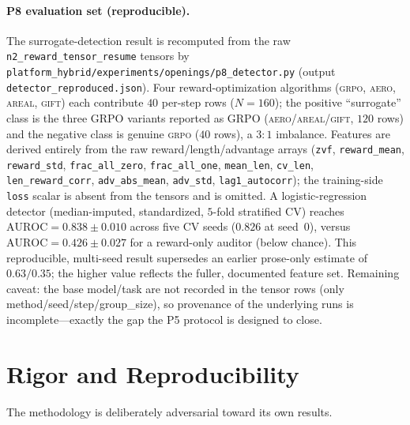 \documentclass[12pt,a4paper]{report}
\begin{document}
\paragraph{P8 evaluation set (reproducible).} The surrogate-detection result is recomputed from the raw \texttt{n2\_reward\_tensor\_resume} tensors by \texttt{platform\_hybrid/experiments/openings/p8\_detector.py} (output \texttt{detector\_reproduced.json}). Four reward-optimization algorithms (\textsc{grpo}, \textsc{aero}, \textsc{areal}, \textsc{gift}) each contribute $40$ per-step rows ($N=160$); the positive ``surrogate'' class is the three GRPO variants reported as GRPO (\textsc{aero}/\textsc{areal}/\textsc{gift}, $120$ rows) and the negative class is genuine \textsc{grpo} ($40$ rows), a $3{:}1$ imbalance. Features are derived entirely from the raw reward/length/advantage arrays (\texttt{zvf}, \texttt{reward\_mean}, \texttt{reward\_std}, \texttt{frac\_all\_zero}, \texttt{frac\_all\_one}, \texttt{mean\_len}, \texttt{cv\_len}, \texttt{len\_reward\_corr}, \texttt{adv\_abs\_mean}, \texttt{adv\_std}, \texttt{lag1\_autocorr}); the training-side \texttt{loss} scalar is absent from the tensors and is omitted. A logistic-regression detector (median-imputed, standardized, $5$-fold stratified CV) reaches $\mathrm{AUROC}=0.838\pm0.010$ across five CV seeds ($0.826$ at seed~0), versus $\mathrm{AUROC}=0.426\pm0.027$ for a reward-only auditor (below chance). This reproducible, multi-seed result supersedes an earlier prose-only estimate of $0.63/0.35$; the higher value reflects the fuller, documented feature set. Remaining caveat: the base model/task are not recorded in the tensor rows (only method/seed/step/group\_size), so provenance of the underlying runs is incomplete---exactly the gap the P5 protocol is designed to close.

\section{Rigor and Reproducibility}
\label{sec:rigor}

The methodology is deliberately adversarial toward its own results.
\end{document}
